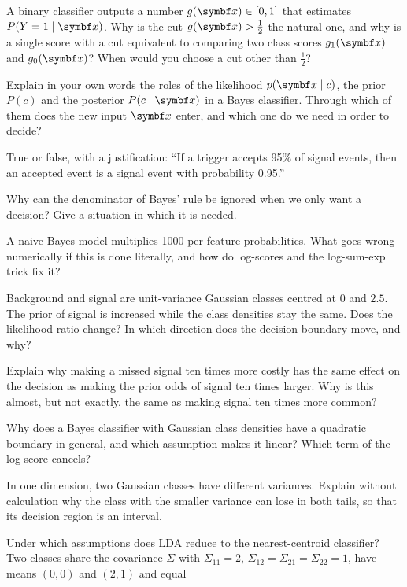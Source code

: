 \documentclass[11pt]{article}
\begin{document}
\begin{questions}
\begin{conceptual}
\item A binary classifier outputs a number $g(\x) \in [0, 1]$ that estimates $P(Y = 1 \mid \x)$. Why is the cut
$g(\x) > \tfrac12$ the natural one, and why is a single score with a cut equivalent to comparing two class scores
$g_1(\x)$ and $g_0(\x)$? When would you choose a cut other than $\tfrac12$?
\item Explain in your own words the roles of the likelihood $p(\x \mid c)$, the prior $P(c)$ and the posterior
$P(c \mid \x)$ in a Bayes classifier. Through which of them does the new input $\x$ enter, and which one do we need in
order to decide?
\item True or false, with a justification: ``If a trigger accepts 95\% of signal events, then an accepted event is a
signal event with probability 0.95.''
\item Why can the denominator of Bayes' rule be ignored when we only want a decision? Give a situation in which it is
needed.
\item A naive Bayes model multiplies 1000 per-feature probabilities. What goes wrong numerically if this is done
literally, and how do log-scores and the log-sum-exp trick fix it?
\item Background and signal are unit-variance Gaussian classes centred at $0$ and $2.5$. The prior of signal is
increased while the class densities stay the same. Does the likelihood ratio change? In which direction does the
decision boundary move, and why?
\item Explain why making a missed signal ten times more costly has the same effect on the decision as making the prior
odds of signal ten times larger. Why is this almost, but not exactly, the same as making signal ten times more common?
\item Why does a Bayes classifier with Gaussian class densities have a quadratic boundary in general, and which
assumption makes it linear? Which term of the log-score cancels?
\item In one dimension, two Gaussian classes have different variances. Explain without calculation why the class with
the smaller variance can lose in both tails, so that its decision region is an interval.
\item Under which assumptions does LDA reduce to the nearest-centroid classifier? Two classes share the covariance
$\Sigma$ with $\Sigma_{11} = 2$, $\Sigma_{12} = \Sigma_{21} = \Sigma_{22} = 1$, have means $(0, 0)$ and $(2, 1)$ and equal

\end{conceptual}
\end{questions}
\end{document}
